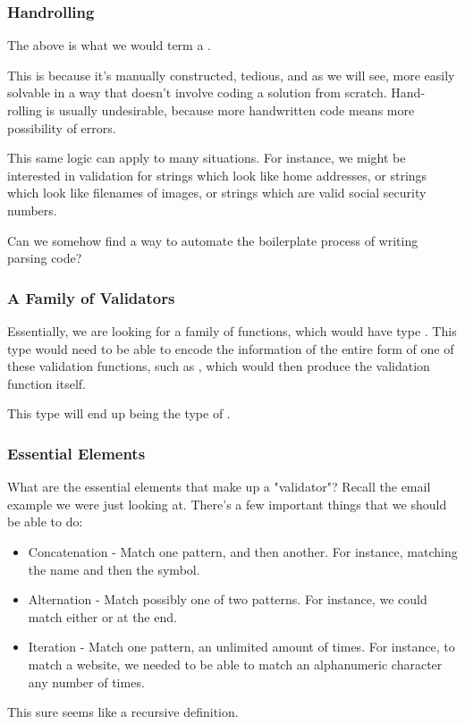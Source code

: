 \documentclass[aspectratio=169]{beamer}
\begin{document}
\begin{frame}[fragile]
  \frametitle{Handrolling}

  The above is what we would term a .

  This is because it's manually constructed, tedious, and as we will
  see, more easily solvable in a way that doesn't involve coding a solution
  from scratch. Hand-rolling is usually undesirable, because more handwritten
  code means more possibility of errors. 

  This same logic can apply to many situations. For instance, we might be
  interested in validation for strings which look like home addresses,
  or strings which look like filenames of images, or strings which are valid
  social security numbers.

  Can we somehow find a way to automate the boilerplate process of writing
  parsing code?
\end{frame}

\begin{frame}[fragile]
  \frametitle{A Family of Validators}

  Essentially, we are looking for a family of functions, which would have
  type . This type  would need to be able
  to encode the information of the entire form of one of these validation functions,
  such as , which would then produce the validation
  function itself.

  This type  will end up being the type of .
\end{frame}


\begin{frame}[fragile]
  \frametitle{Essential Elements}

  What are the essential elements that make up a "validator"? Recall the email
  example we were just looking at. There's a few important things that we should
  be able to do: 

  \begin{itemize}
    \item Concatenation - Match one pattern, and then another. For instance,
    matching the name and then the  symbol.
    \item Alternation - Match possibly one of two patterns. For instance, we
    could match either  or  at the end.
    \item Iteration - Match one pattern, an unlimited amount of times. For instance,
    to match a website, we needed to be able to match an alphanumeric character any
    number of times. 
  \end{itemize}

  This sure seems like a recursive definition.
\end{frame}
\end{document}
